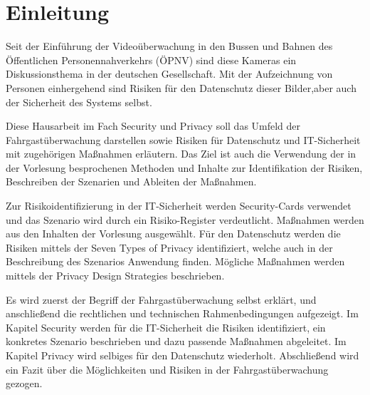 \section{Einleitung}
Seit der Einführung der Videoüberwachung in den Bussen und Bahnen des Öffentlichen Personennahverkehrs (ÖPNV) sind diese Kameras ein Diskussionsthema in
der deutschen Gesellschaft. Mit der Aufzeichnung von Personen einhergehend sind Risiken für den Datenschutz dieser Bilder,aber auch der Sicherheit des Systems selbst.


Diese Hausarbeit im Fach \glqq{}Security und Privacy\grqq{} soll das Umfeld der Fahrgastüberwachung darstellen sowie Risiken für Datenschutz und IT-Sicherheit mit zugehörigen Maßnahmen erläutern.
Das Ziel ist auch die Verwendung der in der Vorlesung besprochenen Methoden und Inhalte zur Identifikation der Risiken, Beschreiben der Szenarien und Ableiten der Maßnahmen.


Zur Risikoidentifizierung in der IT-Sicherheit werden \glqq{}Security-Cards\grqq{} verwendet und das Szenario wird durch ein \glqq{}Risiko-Register\grqq{} verdeutlicht. Maßnahmen werden aus
den Inhalten der Vorlesung ausgewählt. Für den Datenschutz werden die Risiken mittels der \glqq{}Seven Types of Privacy\grqq{} identifiziert, welche auch in der Beschreibung des Szenarios
Anwendung finden. Mögliche Maßnahmen werden mittels der \glqq{}Privacy Design Strategies\grqq{} beschrieben.


Es wird zuerst der Begriff der Fahrgastüberwachung selbst erklärt, und anschließend die rechtlichen und technischen Rahmenbedingungen aufgezeigt. Im Kapitel \glqq{}Security\grqq{} werden für die
IT-Sicherheit die Risiken identifiziert, ein konkretes Szenario beschrieben und dazu passende Maßnahmen abgeleitet. Im Kapitel \glqq{}Privacy\grqq{} wird selbiges für den Datenschutz wiederholt.
Abschließend wird ein Fazit über die Möglichkeiten und Risiken in der Fahrgastüberwachung gezogen.
